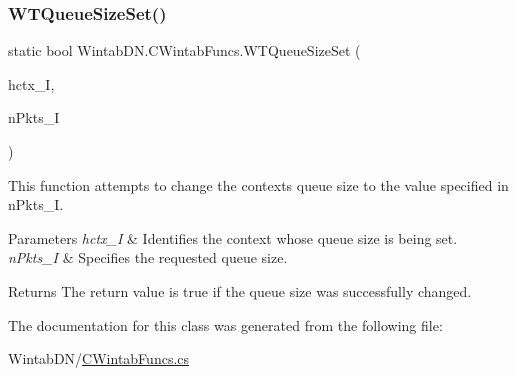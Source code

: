 \subsubsection{\texorpdfstring{W\+T\+Queue\+Size\+Set()}{WTQueueSizeSet()}}
{\footnotesize\ttfamily static bool Wintab\+D\+N.\+C\+Wintab\+Funcs.\+W\+T\+Queue\+Size\+Set (\begin{DoxyParamCaption}\item[{\mbox{\hyperlink{namespace_wintab_d_n_a9ae61204cd14d7ef23008991d1fb6dff}{P\+\_\+\+H\+C\+TX}}}]{hctx\+\_\+I,  }\item[{U\+Int32}]{n\+Pkts\+\_\+I }\end{DoxyParamCaption})}



This function attempts to change the context\textquotesingle{}s queue size to the value specified in n\+Pkts\+\_\+I. 


\begin{DoxyParams}{Parameters}
{\em hctx\+\_\+I} & Identifies the context whose queue size is being set.\\
\hline
{\em n\+Pkts\+\_\+I} & Specifies the requested queue size.\\
\hline
\end{DoxyParams}
\begin{DoxyReturn}{Returns}
The return value is true if the queue size was successfully changed.
\end{DoxyReturn}


The documentation for this class was generated from the following file\+:\begin{DoxyCompactItemize}
\item 
Wintab\+D\+N/\mbox{\hyperlink{_c_wintab_funcs_8cs}{C\+Wintab\+Funcs.\+cs}}\end{DoxyCompactItemize}
